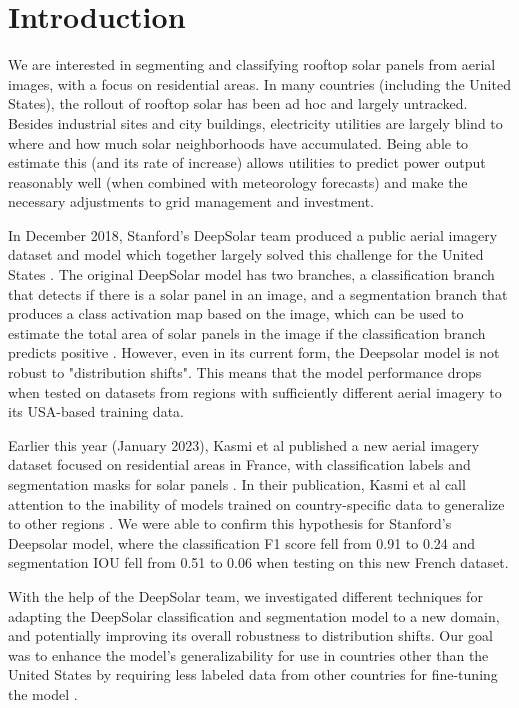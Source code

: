 \documentclass[10pt,twocolumn,letterpaper]{article}
\begin{document}
\section{Introduction}
\label{sec:intro}
We are interested in segmenting and classifying rooftop solar panels from aerial images, with a focus on residential areas. In many countries (including the United States), the rollout of rooftop solar has been ad hoc and largely untracked. Besides industrial sites and city buildings, electricity utilities are largely blind to where and how much solar neighborhoods have accumulated. Being able to estimate this (and its rate of increase) allows utilities to predict power output reasonably well (when combined with meteorology forecasts) and make the necessary adjustments to grid management and investment. \cite{Kasmi2023}

In December 2018, Stanford's DeepSolar team produced a public aerial imagery dataset and model which together largely solved this challenge for the United States \cite{DeepSolar1}. The original DeepSolar model has two branches, a classification branch that detects if there is a solar panel in an image, and a segmentation branch that produces a class activation map based on the image, which can be used to estimate the total area of solar panels in the image if the classification branch predicts positive \cite{DeepSolar1}. However, even in its current form, the Deepsolar model is not robust to "distribution shifts". This means that the model performance drops when tested on datasets from regions with sufficiently different aerial imagery to its USA-based training data. 

Earlier this year (January 2023), Kasmi et al published a new aerial imagery dataset focused on residential areas in France, with classification labels and segmentation masks for solar panels \cite{Kasmi2023}. In their publication, Kasmi et al call attention to the inability of models trained on country-specific data to generalize to other regions \cite{Kasmi2023}. We were able to confirm this hypothesis for Stanford's Deepsolar model, where the classification F1 score fell from 0.91 to 0.24 and segmentation IOU fell from 0.51 to 0.06 when testing on this new French dataset.

With the help of the DeepSolar team, we investigated different techniques for adapting the DeepSolar classification and segmentation model to a new domain, and potentially improving its overall robustness to distribution shifts. Our goal was to enhance the model's generalizability for use in countries other than the United States by requiring less labeled data from other countries for fine-tuning the model \cite{DeepSolar1}. 
\end{document}
